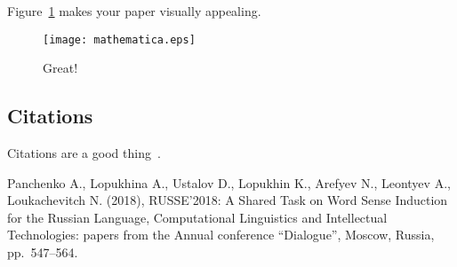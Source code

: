 \documentclass[a4paper]{article}
\begin{document}
Figure~\ref{fig:example} makes your paper visually appealing.

\begin{figure}[htbp]
\centering
\texttt{[image: mathematica.eps]}
\caption{\label{fig:example}Great!}
\end{figure}

\subsection{Citations}

Citations are a good thing~\cite{RUSSE2018}.

\begin{thebibliography}{1}

Panchenko A., Lopukhina A., Ustalov D., Lopukhin K., Arefyev N., Leontyev A., Loukachevitch N. (2018), RUSSE'2018: A Shared Task on Word Sense Induction for the Russian Language, Computational Linguistics and Intellectual Technologies: papers from the Annual conference ``Dialogue'', Moscow, Russia, pp.~547--564.

\end{thebibliography}
\end{document}
